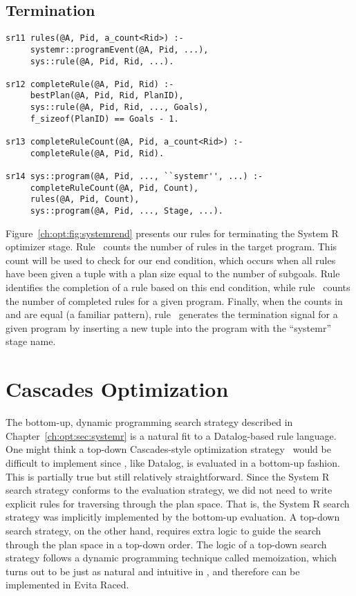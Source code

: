 \subsection{Termination}
\label{ch:opt:sec:termination}

\begin{figure*}
\ssp
\centering
\begin{lstlisting}
sr11 rules(@A, Pid, a_count<Rid>) :-
     systemr::programEvent(@A, Pid, ...),
     sys::rule(@A, Pid, Rid, ...).

sr12 completeRule(@A, Pid, Rid) :-
     bestPlan(@A, Pid, Rid, PlanID),
     sys::rule(@A, Pid, Rid, ..., Goals),
     f_sizeof(PlanID) == Goals - 1.

sr13 completeRuleCount(@A, Pid, a_count<Rid>) :-
     completeRule(@A, Pid, Rid).

sr14 sys::program(@A, Pid, ..., ``systemr'', ...) :-
     completeRuleCount(@A, Pid, Count),
     rules(@A, Pid, Count),
     sys::program(@A, Pid, ..., Stage, ...).
\end{lstlisting}
\caption{\label{ch:opt:fig:systemrend}System R termination rules.}
\end{figure*}

Figure~\ref{ch:opt:fig:systemrend} presents our rules for terminating the
System R optimizer stage.  Rule~ counts the number of rules in the
target program.  This count will be used to check for our end condition, which
occurs when all rules have been given a  tuple with a plan size
equal to the number of subgoals.  Rule~ identifies the completion of a
rule based on this end condition, while rule~ counts the number of
completed rules for a given program.  Finally, when the counts in
 and  are equal (a familiar pattern),
rule~ generates the termination signal for a given program by
inserting a new tuple into the  program with the ``systemr'' stage
name.

\section{Cascades Optimization}
\label{ch:opt:sec:cascades}

The bottom-up, dynamic programming search strategy described in
Chapter~\ref{ch:opt:sec:systemr} is a natural fit to a Datalog-based rule
language.  One might think a top-down Cascades-style optimization
strategy~\cite{cascades} would be difficult to implement since \OVERLOG, like
Datalog, is evaluated in a bottom-up fashion.  This is partially true but still
relatively straightforward.  Since the System R search strategy conforms to the
\OVERLOG evaluation strategy, we did not need to write explicit rules for
traversing through the plan space.  That is, the System R search strategy was
implicitly implemented by the \OVERLOG bottom-up evaluation.  A top-down search
strategy, on the other hand, requires extra logic to guide the search through
the plan space in a top-down order.  The logic of a top-down search strategy
follows a dynamic programming technique called memoization, which turns out to
be just as natural and intuitive in \OVERLOG, and therefore can be implemented
in Evita Raced.

